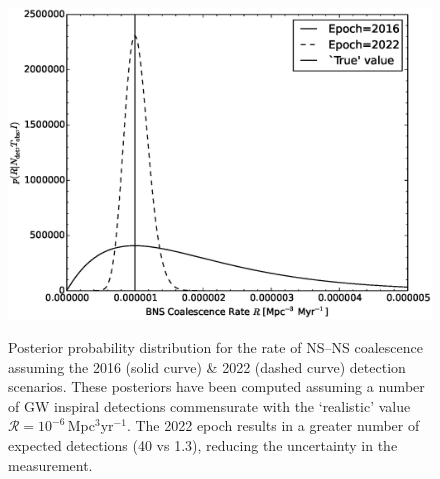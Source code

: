 \documentclass[twocolumn,nofootinbib]{revtex4-1}
\newcommand{\cbcrate}{{{\mathcal R}}}
\newcommand{\BNS}{\ac{NS}--\ac{NS}\xspace}
\begin{document}
\begin{figure}
\centering
{\includegraphics[width=\linewidth]{aligo_rate_re.eps}}
\caption{Posterior probability distribution for the rate of \BNS coalescence assuming the 2016 (solid curve) \& 2022 (dashed curve) detection scenarios.
    These posteriors have been computed assuming a number of \ac{GW} inspiral detections commensurate with the `realistic' value $\cbcrate=10^{-6}$\,Mpc$^{3}$yr$^{-1}$.
    The 2022 epoch results in a greater number of expected detections (40 vs 1.3), reducing the uncertainty in the measurement.
    \label{fig:aligorate}}
\end{figure}
\end{document}
